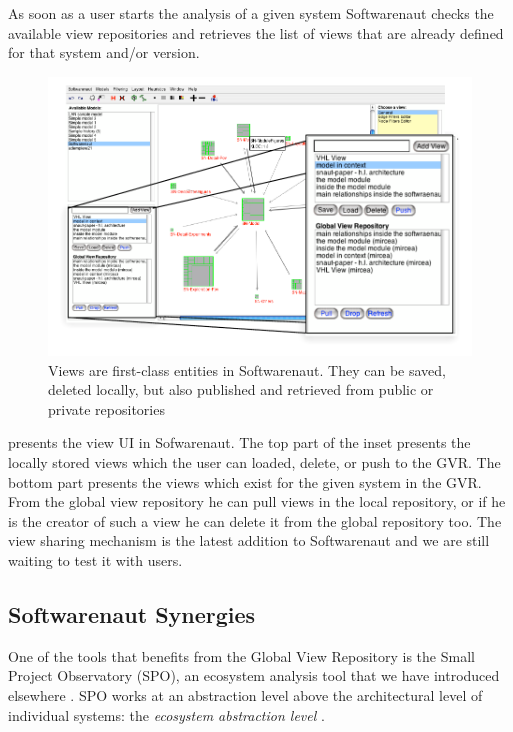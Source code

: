 \documentclass[preprint,12pt]{elsarticle}
\begin{document}
As soon as a user starts the analysis of a given system Softwarenaut checks the available view repositories and retrieves the list of views that are already defined for that system and/or version.


\begin{figure}[h]
\begin{center}
\includegraphics[width=\linewidth]{images/ViewOperations.pdf}
\caption{Views are first-class entities in Softwarenaut. They can be saved, deleted locally, but also published and retrieved from public or private repositories}
\end{center}
\end{figure}

 presents the view UI in Sofwarenaut. The top part of the inset presents the locally stored views which the user can loaded, delete, or push to the GVR. The bottom part presents the views which exist for the given system in the GVR. From the global view repository he can pull views in the local repository, or if he is the creator of such a view he can delete it from the global repository too. The view sharing mechanism is the latest addition to Softwarenaut and we are still waiting to test it with users. 


\subsection {Softwarenaut Synergies}
One of the tools that benefits from the Global View Repository is the Small Project Observatory (SPO), an ecosystem analysis tool that we have introduced elsewhere \cite{lungu-est}. SPO works at an abstraction level above the architectural level of individual systems: the {\em ecosystem abstraction level} \cite{lungu-thesis}. 
\end{document}

